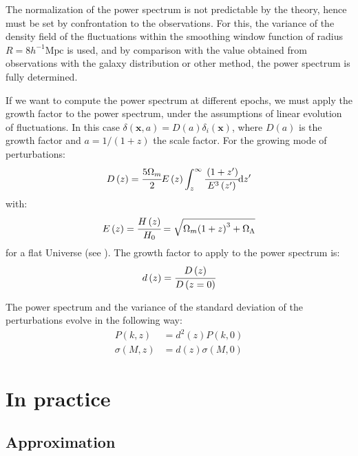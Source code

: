 The normalization of the power spectrum is not predictable by the theory, hence
must be set by confrontation to the observations. For this, the variance of the
density field of the fluctuations within the smoothing window function of
radius $R=8 h^{-1}\mathrm{Mpc}$ is used, and by comparison with the value
obtained from observations with the galaxy distribution or other method, the
power spectrum is fully determined.

If we want to compute the power spectrum at different epochs, we must apply the
growth factor to the power spectrum, under the assumptions of linear evolution
of fluctuations. In this case $\delta \left(\textbf{x}, a\right) = D
\left(a\right) \delta_i \left(\textbf{x}\right)$, where $D\left(a\right)$ is
the growth factor and $a=1/ \left(1+z\right)$ the scale factor. For the growing mode of
perturbations:
%
\begin{equation}
    D \left(z\right) = \cfrac{5\Omega_m}{2}E \left(z\right)
    \int_z^\infty \cfrac{\left(1+z'\right)}{E^3\left(z'\right)} {\rm{d}} z'
\end{equation}
%
with:
%
\begin{equation}
    E \left(z\right) = \cfrac{H \left(z\right)}{H_0} =
    \sqrt{\Omega_m {\left(1+z\right)}^3 + \Omega_\Lambda}
\end{equation}
%
for a flat Universe (see \citet{Hogg+99, Carroll+92}). The growth factor to
apply to the power spectrum is:
%
\begin{equation}
    d \left(z\right) = \cfrac{D \left(z\right)}{D \left(z=0\right)}
\end{equation}

The power spectrum and the variance of the standard deviation of the
perturbations evolve in the following way:
%
\begin{align}
    P \left(k, z\right) &= d^2 \left(z\right) P \left(k, 0\right)
    \nonumber\\
    \sigma \left(M, z\right) &= d \left(z\right) \sigma \left(M,0\right)
\end{align}

\section{In practice}
\label{sec:in_practice}

\subsection{Approximation}
\label{sub:approximation}

